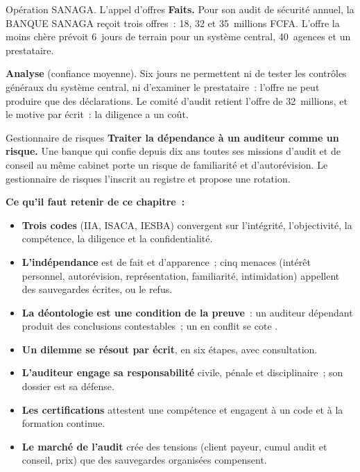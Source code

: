 \begin{boxscenario}{Opération SANAGA. L'appel d'offres}
\textbf{Faits.} Pour son audit de sécurité annuel, la BANQUE SANAGA reçoit
trois offres~: 18, 32 et 35~millions FCFA. L'offre la moins chère prévoit
6~jours de terrain pour un système central, 40~agences et un prestataire.

\medskip
\textbf{Analyse} (confiance moyenne). Six jours ne permettent ni de tester
les contrôles généraux du système central, ni d'examiner le prestataire~:
l'offre ne peut produire que des déclarations. Le comité d'audit retient
l'offre de 32~millions, et le motive par écrit~: la diligence a un coût.
\end{boxscenario}

\begin{boxmetier}{Gestionnaire de risques}
\textbf{Traiter la dépendance à un auditeur comme un risque.} Une banque
qui confie depuis dix ans toutes ses missions d'audit et de conseil au
même cabinet porte un risque de familiarité et d'autorévision. Le
gestionnaire de risques l'inscrit au registre et propose une rotation.
\end{boxmetier}

\separateur

\begin{boxresume}
\textbf{Ce qu'il faut retenir de ce chapitre~:}
\begin{itemize}
    \item \textbf{Trois codes} (IIA, ISACA, IESBA) convergent sur
          l'intégrité, l'objectivité, la compétence, la diligence et la
          confidentialité.
    \item \textbf{L'indépendance} est de fait et d'apparence~; cinq menaces
          (intérêt personnel, autorévision, représentation, familiarité,
          intimidation) appellent des sauvegardes écrites, ou le refus.
    \item \textbf{La déontologie est une condition de la preuve}~: un
          auditeur dépendant produit des conclusions contestables~; un
          \OUI{} en conflit se cote \NEK{}.
    \item \textbf{Un dilemme se résout par écrit}, en six étapes, avec
          consultation.
    \item \textbf{L'auditeur engage sa responsabilité} civile, pénale et
          disciplinaire~; son dossier est sa défense.
    \item \textbf{Les certifications} attestent une compétence et engagent à
          un code et à la formation continue.
    \item \textbf{Le marché de l'audit} crée des tensions (client payeur,
          cumul audit et conseil, prix) que des sauvegardes organisées
          compensent.
\end{itemize}
\end{boxresume}

